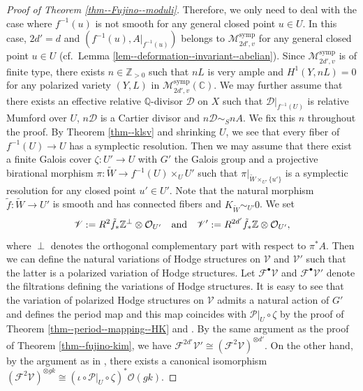 \documentclass[12pt,twoside]{amsart}
\theoremstyle{definition}
\begin{document}
\begin{proof}[Proof of Theorem \ref{thm--Fujino--moduli}]
Therefore, we only need to deal with the case where $f^{-1}(u)$ is not smooth for any general closed point $u\in U$.
In this case, $2d'=d$ and $(f^{-1}(u),A|_{f^{-1}(u)})$ belongs to $\mathcal{M}_{2d',v}^{\mathrm{symp}}$ for any general closed point $u\in U$ (cf.~Lemma \ref{lem--deformation--invariant--abelian}).
Since $\mathcal{M}_{2d',v}^{\mathrm{symp}}$ is of finite type, there exists $n\in\mathbb{Z}_{>0}$ such that $nL$ is very ample and $H^1(Y,nL)=0$ for any polarized variety $(Y,L)$ in $\mathcal{M}_{2d',v}^{\mathrm{symp}}(\mathbb{C})$.
We may further assume that there exists an effective relative $\mathbb{Q}$-divisor $\mathcal{D}$ on $X$ such that $\mathcal{D}|_{f^{-1}(U)}$ is relative Mumford over $U$,  $n\mathcal{D}$ is a Cartier divisor and $n\mathcal{D}\sim_{S}nA$.
We fix this $n$ throughout the proof. 
By Theorem \ref{thm--klsv} and shrinking $U$, we see that every fiber of $f^{-1}(U) \to U$ has a symplectic resolution. 
Then we may assume that there exist a finite Galois cover $\zeta\colon U'\to U$ with $G'$ the Galois group and a projective birational morphism $\pi\colon \widetilde{W}\to f^{-1}(U)\times_UU'$ such that $\pi|_{\widetilde{W}\times_{U'}\{u'\}}$ is a symplectic resolution for any closed point $u'\in U'$.
Note that the natural morphism $\tilde{f}\colon\widetilde{W}\to U'$ is smooth and has connected fibers and $K_{\widetilde{W}}\sim_{U'}0$.
We set
$$\mathscr{V}:=R^{2}\tilde{f}_*\mathbb{Z}^\perp\otimes\mathcal{O}_{U'} \quad {\rm and} \quad \mathscr{V}':=R^{2d'}\tilde{f}_*\mathbb{Z}\otimes\mathcal{O}_{U'},$$ where $\perp$ denotes the orthogonal complementary part with respect to $\pi^*A$. 
Then we can define the natural variations of Hodge structures on $\mathscr{V}$ and $\mathscr{V}'$ such that the latter is a polarized variation of Hodge structures.
Let $\mathscr{F}^\bullet \mathscr{V}$ and $\mathscr{F}^\bullet \mathscr{V}'$ denote the filtrations defining the variations of Hodge structures.
It is easy to see that the variation of polarized Hodge structures on $\mathscr{V}$ admits a natural action of $G'$ and defines the period map and this map coincides with $\mathcal{P}|_U\circ \zeta$ by the proof of Theorem \ref{thm--period--mapping--HK} and \cite[Theorem 3.1]{MarkmanSurvey}.
By the same argument as the proof of Theorem \ref{thm--fujino-kim}, we have $\mathscr{F}^{2d'}\mathscr{V}'\cong (\mathscr{F}^2\mathscr{V})^{\otimes d'}$.
On the other hand, by the argument as in \cite[2.21]{fujino--canonical-certain}, there exists a canonical isomorphism $(\mathscr{F}^2\mathscr{V})^{\otimes gk}\cong (\iota\circ \mathcal{P}|_{U}\circ\zeta)^*\mathcal{O}(gk)$.

\end{proof}
\end{document}
